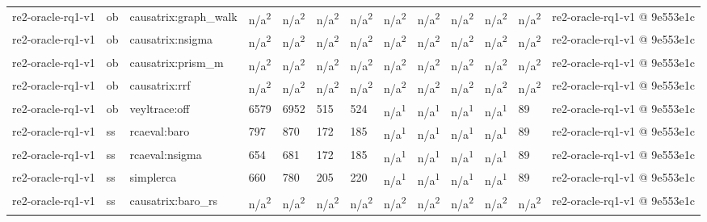 \begin{table}[t]
\begin{tabular}{lllllllllllll}
re2-oracle-rq1-v1 & ob & causatrix:graph\_walk & n/a\textsuperscript{2} & n/a\textsuperscript{2} & n/a\textsuperscript{2} & n/a\textsuperscript{2} & n/a\textsuperscript{2} & n/a\textsuperscript{2} & n/a\textsuperscript{2} & n/a\textsuperscript{2} & n/a\textsuperscript{2} & re2-oracle-rq1-v1 @ 9e553e1c \\
re2-oracle-rq1-v1 & ob & causatrix:nsigma & n/a\textsuperscript{2} & n/a\textsuperscript{2} & n/a\textsuperscript{2} & n/a\textsuperscript{2} & n/a\textsuperscript{2} & n/a\textsuperscript{2} & n/a\textsuperscript{2} & n/a\textsuperscript{2} & n/a\textsuperscript{2} & re2-oracle-rq1-v1 @ 9e553e1c \\
re2-oracle-rq1-v1 & ob & causatrix:prism\_m & n/a\textsuperscript{2} & n/a\textsuperscript{2} & n/a\textsuperscript{2} & n/a\textsuperscript{2} & n/a\textsuperscript{2} & n/a\textsuperscript{2} & n/a\textsuperscript{2} & n/a\textsuperscript{2} & n/a\textsuperscript{2} & re2-oracle-rq1-v1 @ 9e553e1c \\
re2-oracle-rq1-v1 & ob & causatrix:rrf & n/a\textsuperscript{2} & n/a\textsuperscript{2} & n/a\textsuperscript{2} & n/a\textsuperscript{2} & n/a\textsuperscript{2} & n/a\textsuperscript{2} & n/a\textsuperscript{2} & n/a\textsuperscript{2} & n/a\textsuperscript{2} & re2-oracle-rq1-v1 @ 9e553e1c \\
re2-oracle-rq1-v1 & ob & veyltrace:off & 6579 & 6952 & 515 & 524 & n/a\textsuperscript{1} & n/a\textsuperscript{1} & n/a\textsuperscript{1} & n/a\textsuperscript{1} & 89 & re2-oracle-rq1-v1 @ 9e553e1c \\
re2-oracle-rq1-v1 & ss & rcaeval:baro & 797 & 870 & 172 & 185 & n/a\textsuperscript{1} & n/a\textsuperscript{1} & n/a\textsuperscript{1} & n/a\textsuperscript{1} & 89 & re2-oracle-rq1-v1 @ 9e553e1c \\
re2-oracle-rq1-v1 & ss & rcaeval:nsigma & 654 & 681 & 172 & 185 & n/a\textsuperscript{1} & n/a\textsuperscript{1} & n/a\textsuperscript{1} & n/a\textsuperscript{1} & 89 & re2-oracle-rq1-v1 @ 9e553e1c \\
re2-oracle-rq1-v1 & ss & simplerca & 660 & 780 & 205 & 220 & n/a\textsuperscript{1} & n/a\textsuperscript{1} & n/a\textsuperscript{1} & n/a\textsuperscript{1} & 89 & re2-oracle-rq1-v1 @ 9e553e1c \\
re2-oracle-rq1-v1 & ss & causatrix:baro\_rs & n/a\textsuperscript{2} & n/a\textsuperscript{2} & n/a\textsuperscript{2} & n/a\textsuperscript{2} & n/a\textsuperscript{2} & n/a\textsuperscript{2} & n/a\textsuperscript{2} & n/a\textsuperscript{2} & n/a\textsuperscript{2} & re2-oracle-rq1-v1 @ 9e553e1c \\

\end{tabular}
\end{table}
